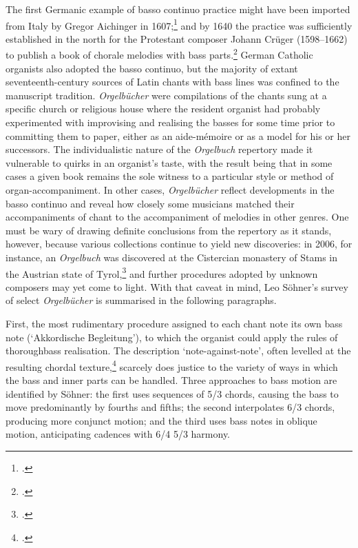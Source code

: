 The first Germanic example of basso continuo practice might have been imported from Italy by Gregor Aichinger in 1607;\footnote{\covid{}\cite{AichingerCantionesecclesiasticaetre1607}.} and by 1640 the practice was sufficiently established in the north for the Protestant composer Johann Crüger (1598--1662) to publish a book of chorale melodies with bass parts.\footnote{\covid{}\cite{CruegerNewesvollkoemlichesGesangbuch1640}.}
German Catholic organists also adopted the basso continuo, but the majority of extant seventeenth-century sources of Latin chants with bass lines was confined to the manuscript tradition.
\emph{Orgelbücher} were compilations of the chants sung at a specific church or religious house where the resident organist had probably experimented with improvising and realising the basses for some time prior to committing them to paper, either as an aide-mémoire or as a model for his or her successors.
The individualistic nature of the \emph{Orgelbuch} repertory made it vulnerable to quirks in an organist's taste, with the result being that in some cases a given book remains the sole witness to a particular style or method of organ-accompaniment.
In other cases, \emph{Orgelbücher} reflect developments in the basso continuo and reveal how closely some musicians matched their accompaniments of chant to the accompaniment of melodies in other genres.
One must be wary of drawing definite conclusions from the repertory as it stands, however, because various collections continue to yield new discoveries: in 2006, for instance, an \emph{Orgelbuch} was discovered at the Cistercian monastery of Stams in the Austrian state of Tyrol,\footcite[110--12]{Herrmann-SchneiderChoralgesangmitGeneralbassBegleitung2010} and further procedures adopted by unknown composers may yet come to light.
With that caveat in mind, Leo Söhner's survey of select \emph{Orgelbücher} is summarised in the following paragraphs.

First, the most rudimentary procedure assigned to each chant note its own bass note (`Akkordische Begleitung'), to which the organist could apply the rules of thoroughbass realisation.
The description `note-against-note', often levelled at the resulting chordal texture,\footcite[95]{PrasslAnmerkungenzurOrgelbegleitung2012} scarcely does justice to the variety of ways in which the bass and inner parts can be handled.
Three approaches to bass motion are identified by Söhner: the first uses sequences of 5/3 chords, causing the bass to move predominantly by fourths and fifths; the second interpolates 6/3 chords, producing more conjunct motion; and the third uses bass notes in oblique motion, anticipating cadences with 6/4 \rightarrow{} 5/3 harmony.

